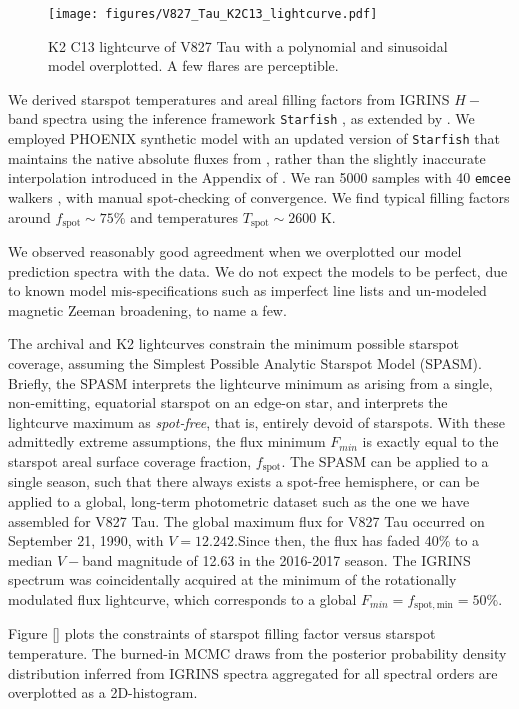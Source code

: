\documentclass[twocolumn]{emulateapj}%
\begin{document}
 \begin{figure*}
 \centering
 \texttt{[image: figures/V827\_Tau\_K2C13\_lightcurve.pdf]}
 \caption{K2 C13 lightcurve of V827 Tau with a polynomial and sinusoidal model overplotted.  A few flares are perceptible.}
 \label{fig:V827TauK2}
\end{figure*}

We derived starspot temperatures and areal filling factors from IGRINS $H-$band spectra using the inference framework \texttt{Starfish} \citep{czekala15}, as extended by \citet{2017ApJ...836..200G}.  We employed PHOENIX synthetic model with an updated version of \texttt{Starfish} that maintains the native absolute fluxes from \citet{husser13}, rather than the slightly inaccurate interpolation introduced in the Appendix of \citet{2017ApJ...836..200G}.  We ran 5000 samples with 40 \texttt{emcee} walkers \citep{foreman13}, with manual spot-checking of convergence.  We find typical filling factors around $f_\mathrm{spot} \sim 75\%$ and temperatures $T_\mathrm{spot} \sim 2600$ K.

We observed reasonably good agreedment when we overplotted our model prediction spectra with the data.  We do not expect the models to be perfect, due to known model mis-specifications such as imperfect line lists and un-modeled magnetic Zeeman broadening, to name a few.

The archival and K2 lightcurves constrain the minimum possible starspot coverage, assuming the Simplest Possible Analytic Starspot Model (SPASM).  Briefly, the SPASM interprets the lightcurve minimum as arising from a single, non-emitting, equatorial starspot on an edge-on star, and interprets the lightcurve maximum as \emph{spot-free}, that is, entirely devoid of starspots.  With these admittedly extreme assumptions, the flux minimum $F_{min}$ is exactly equal to the starspot areal surface coverage fraction, $f_{\mathrm{spot}}$.  The SPASM can be applied to a single season, such that there always exists a spot-free hemisphere, or can be applied to a global, long-term photometric dataset such as the one we have assembled for V827 Tau.  The global maximum flux for V827 Tau occurred on September 21, 1990, with $V=12.242$.Since then, the flux has faded 40\% to a median $V-$band magnitude of 12.63 in the 2016-2017 season.  The IGRINS spectrum was coincidentally acquired at the minimum of the rotationally modulated flux lightcurve, which corresponds to a global $F_{min} = f_{\mathrm{spot, min}} = 50\%$.

Figure \ref{} plots the constraints of starspot filling factor versus starspot temperature.  The burned-in MCMC draws from the posterior probability density distribution inferred from IGRINS spectra aggregated for all spectral orders are overplotted as a 2D-histogram.
\end{document}
